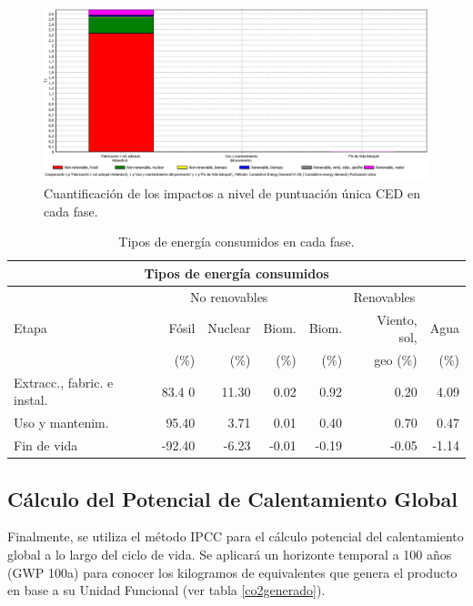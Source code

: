 \begin{figure}[!htb]
\centering
\includegraphics[width=15cm]{img/ced_puntuacionunica.png}
\caption{Cuantificación de los impactos a nivel de puntuación única CED en cada fase.}
\label{fig:ced_puntuacionunica}
\end{figure}

\begin{table}[!htb]
\centering
\begin{tabular}{p{2cm}rrrrrr}
\toprule
\multicolumn{7}{c}{Tipos de energía consumidos}\\
\midrule
 & \multicolumn{3}{c}{No renovables} & \multicolumn{3}{c}{Renovables}\\
\midrule
Etapa & Fósil & Nuclear & Biom. & Biom. & Viento, sol,& Agua\\
& (\%) & (\%) & (\%) & (\%) & geo (\%) & (\%)\\
\midrule
Extracc., fabric. e instal. & 83.4 0& 11.30 & 0.02 & 0.92 & 0.20 & 4.09\\
Uso y mantenim. & 95.40 & 3.71 & 0.01 & 0.40 & 0.70 & 0.47 \\
Fin de vida & -92.40 & -6.23 & -0.01 & -0.19 & -0.05 & -1.14 \\
\bottomrule
\end{tabular}
\caption{Tipos de energía consumidos en cada fase.}
\label{tiposenergiaced}
\end{table}

\subsection{Cálculo del Potencial de Calentamiento Global}
Finalmente, se utiliza el método IPCC para el cálculo potencial del calentamiento global a lo largo del ciclo de vida. Se aplicará un horizonte temporal a 100 años (GWP 100a) para conocer los kilogramos de  equivalentes que genera el producto en base a su Unidad Funcional (ver tabla \ref{co2generado}).

